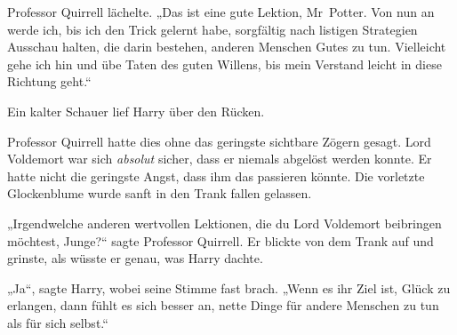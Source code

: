 Professor Quirrell lächelte.
„Das ist eine gute Lektion, Mr~Potter. Von nun an werde ich, bis ich den Trick gelernt habe, sorgfältig nach listigen Strategien Ausschau halten, die darin bestehen, anderen Menschen Gutes zu tun. Vielleicht gehe ich hin und übe Taten des guten Willens, bis mein Verstand leicht in diese Richtung geht.“

Ein kalter Schauer lief Harry über den Rücken.

Professor Quirrell hatte dies ohne das geringste sichtbare Zögern gesagt.
Lord Voldemort war sich \emph{absolut} sicher, dass er niemals abgelöst werden konnte. Er hatte nicht die geringste Angst, dass ihm das passieren könnte.
Die vorletzte Glockenblume wurde sanft in den Trank fallen gelassen.

„Irgendwelche anderen wertvollen Lektionen, die du Lord Voldemort beibringen möchtest, Junge?“ sagte Professor Quirrell. Er blickte von dem Trank auf und grinste, als wüsste er genau, was Harry dachte.

„Ja“, sagte Harry, wobei seine Stimme fast brach.
„Wenn es ihr Ziel ist, Glück zu erlangen, dann fühlt es sich besser an, nette Dinge für andere Menschen zu tun als für sich selbst.“

